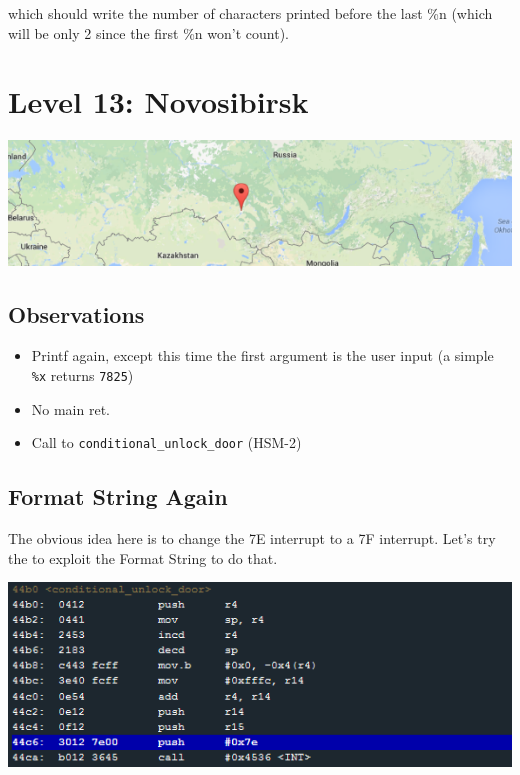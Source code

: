 which should write the number of characters printed before the last \%n
(which will be only 2 since the first \%n won't count).

\section{Level 13: Novosibirsk}\label{level-13-novosibirsk}

\includegraphics{img/13_1.PNG}

\subsection{Observations}\label{observations-5}

\begin{itemize}
\itemsep1pt\parskip0pt
\item
  Printf again, except this time the first argument is the user input (a
  simple \texttt{\%x} returns \texttt{7825})
\item
  No main ret.
\item
  Call to \texttt{conditional\_unlock\_door} (HSM-2)
\end{itemize}

\subsection{Format String Again}\label{format-string-again}

The obvious idea here is to change the 7E interrupt to a 7F interrupt.
Let's try the to exploit the Format String to do that.

\includegraphics{img/13_2.PNG}

